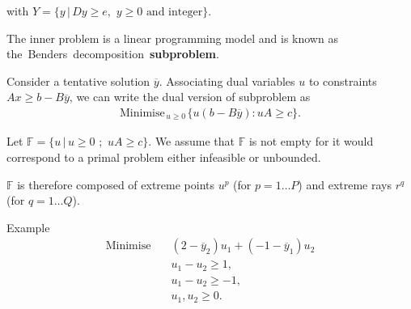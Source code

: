 with $Y = \{ y \, |\, Dy \geq e, \,\, y \geq 0
\textrm{ and integer} \}$.

\vspace{1cm}

The inner problem is a linear programming model and is known as \\ \mbox{the Benders decomposition~\textbf{subproblem}}.


\newpage

Consider a tentative solution $\overline{y}$. Associating dual variables $u$ to constraints $Ax \geq
b-B\overline{y}$, we can write the dual version of  subproblem as
\begin{eqnarray*}
\label{bd3}  \textrm{Minimise}_{\, u\geq 0 \,} \{ u(b-B\overline{y}) :
uA \geq c\}.
\end{eqnarray*}


Let  $\mathbb{F} = \{ u \, |\, u \geq 0 \,\, ; \, \, uA \geq c \}$.  We assume that $\mathbb{F}$ is not empty for it would correspond to a primal problem either infeasible or
unbounded. 

$\mathbb{F}$ is therefore composed of extreme points $u^p$ (for
$p=1 \dots P$) and extreme rays $r^q$ (for $q=1 \dots Q$).\\


\begin{bclogo}[logo=\bccrayon]{\small Example }
\small \vspace{-.5cm}
\begin{align*}
\textrm{Minimise} \quad &  (2-\overline{y}_2)u_1 + (-1 - \overline{y}_1)u_2 \\
& u_1 -  u_2  \geq 1, \\
& u_1 -u_2 \geq -1, \\
& u_1, u_2 \geq 0.
\end{align*}

\end{bclogo}




\begin{center}
\end{center}


